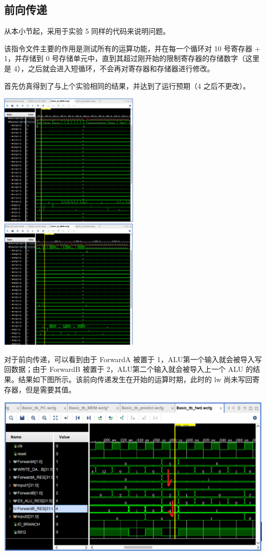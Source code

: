 \documentclass[a4paper,UTF8]{ctexart}
\providecommand{\code}[2]{}
\begin{document}
\subsection{前向传递}

从本小节起，采用于实验 5 同样的代码来说明问题。

\begin{multicols}{2}
    \scriptsize
    该指令文件主要的作用是测试所有的运算功能，并在每一个循环对 10 号寄存器 + 1，并存储到 0 号存储单元中，直到其超过刚开始的限制寄存器的存储数字（这里是 4），之后就会进入短循环，不会再对寄存器和存储器进行修改。
    \code{simple.asm}{}
\end{multicols}

首先仿真得到了与上个实验相同的结果，并达到了运行预期（4 之后不更改）。

\noindent
\includegraphics[width=0.5\textwidth]{local.png}
\includegraphics[width=0.5\textwidth]{global.png}

对于前向传递，可以看到由于 ForwardA 被置于 1，ALU第一个输入就会被导入写回数据；由于 ForwardB 被置于 2，ALU第二个输入就会被导入上一个 ALU 的结果。结果如下图所示。该前向传递发生在开始的运算时期，此时的 lw 尚未写回寄存器，但是需要其值。

\includegraphics[width=\textwidth]{forward.png}
\end{document}
